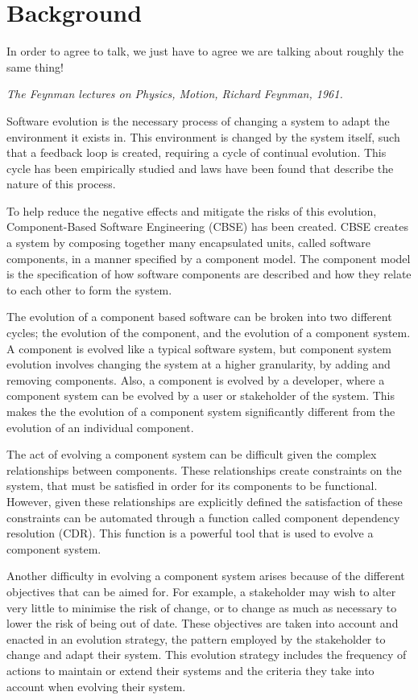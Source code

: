 \chapter{Background}
\label{background}
\epigraph{
In order to agree to talk, we just have to agree we are talking about roughly the same thing!
}
{\textit{The Feynman lectures on Physics, Motion, Richard Feynman, 1961.}}

Software evolution is the necessary process of changing a system to adapt the environment it exists in.
This environment is changed by the system itself, such that a feedback loop \cite{lehman1980} is created, requiring a cycle of continual evolution.
This cycle has been empirically studied and laws have been found that describe the nature of this process.  

To help reduce the negative effects and mitigate the risks of this evolution, Component-Based Software Engineering (CBSE) has been created. 
CBSE creates a system by composing together many encapsulated units, called software components, in a manner specified by a component model.
The component model is the specification of how software components are described and how they relate to each other to form the system.

The evolution of a component based software can be broken into two different cycles; the evolution of the component, and the evolution of a component system. 
A component is evolved like a typical software system, 
but component system evolution involves changing the system at a higher granularity, by adding and removing components.
Also, a component is evolved by a developer, where a component system can be evolved by a user or stakeholder of the system.
This makes the the evolution of a component system significantly different from the evolution of an individual component.

The act of evolving a component system can be difficult given the complex relationships between components.
These relationships create constraints on the system, that must be satisfied in order for its components to be functional.
However, given these relationships are explicitly defined the satisfaction of these constraints can be automated through a function called component dependency resolution (CDR).
This function is a powerful tool that is used to evolve a component system.

Another difficulty in evolving a component system arises because of the different objectives that can be aimed for.
For example, a stakeholder may wish to alter very little to minimise the risk of change, or to change as much as necessary to lower the risk of being out of date.  
These objectives are taken into account and enacted in an evolution strategy, the pattern employed by the stakeholder to change and adapt their system.
This evolution strategy includes the frequency of actions to maintain or extend their systems and the criteria they take into account when evolving their system.

